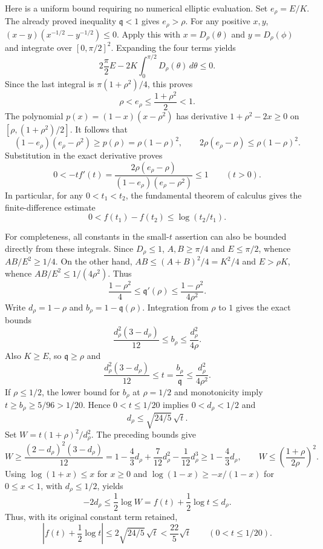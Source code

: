 Here is a uniform bound requiring no numerical elliptic evaluation.
Set $e_\rho=E/K$. The already proved inequality $\mathfrak q<1$ gives $e_\rho>\rho$.
For any positive $x,y$, $(x-y)(x^{-1/2}-y^{-1/2})\le0$.
Apply this with $x=D_\rho(\theta)$ and $y=D_\rho(\phi)$ and
integrate over $[0,\pi/2]^2$. Expanding the four terms yields
\[
 2\frac\pi2 E-2K\int_0^{\pi/2}D_\rho(\theta)\,d\theta\le0.
\]
Since the last integral is $\pi(1+\rho^2)/4$, this proves
\[
 \rho<e_\rho\le\frac{1+\rho^2}{2}<1.
\]
The polynomial $p(x)=(1-x)(x-\rho^2)$ has derivative
$1+\rho^2-2x\ge0$ on $[\rho,(1+\rho^2)/2]$.
It follows that
\[
 (1-e_\rho)(e_\rho-\rho^2)\ge p(\rho)=\rho(1-\rho)^2,
 \qquad 2\rho(e_\rho-\rho)\le\rho(1-\rho)^2.
\]
Substitution in the exact derivative proves
\[
 \boxed{0<-t f'(t)
 =\frac{2\rho(e_\rho-\rho)}{(1-e_\rho)(e_\rho-\rho^2)}\le1\qquad(t>0).}
\]
In particular, for any $0<t_1<t_2$, the fundamental theorem of calculus
gives the finite-difference estimate
\[
 0<f(t_1)-f(t_2)\le\log(t_2/t_1).
\]

For completeness, all constants in the small-$t$ assertion can also
be bounded directly from these integrals. Since $D_\rho\le1$,
$A,B\ge\pi/4$ and $E\le\pi/2$, whence $AB/E^2\ge1/4$.
On the other hand, $AB\le(A+B)^2/4=K^2/4$ and $E>\rho K$,
whence $AB/E^2\le1/(4\rho^2)$. Thus
\[
 \frac{1-\rho^2}{4}\le \mathfrak q'(\rho)
 \le\frac{1-\rho^2}{4\rho^2}.
\]
Write $d_\rho=1-\rho$ and $b_\rho=1-\mathfrak q(\rho)$.
Integration from $\rho$ to $1$ gives the exact bounds
\[
 \frac{d_\rho^2(3-d_\rho)}{12}\le b_\rho
 \le\frac{d_\rho^2}{4\rho}.
\]
Also $K\ge E$, so $\mathfrak q\ge\rho$ and
\[
 \frac{d_\rho^2(3-d_\rho)}{12}\le t=\frac{b_\rho}{\mathfrak q}
 \le\frac{d_\rho^2}{4\rho^2}.
\]
If $\rho\le1/2$, the lower bound for $b_\rho$ at $\rho=1/2$ and
monotonicity imply $t\ge b_\rho\ge5/96>1/20$.
Hence $0<t\le1/20$ implies $0<d_\rho<1/2$ and
\[
 d_\rho\le\sqrt{24/5}\,\sqrt t.
\]
Set $W=t(1+\rho)^2/d_\rho^2$. The preceding bounds give
\[
 W\ge\frac{(2-d_\rho)^2(3-d_\rho)}{12}
 =1-\frac43d_\rho+\frac7{12}d_\rho^2-\frac1{12}d_\rho^3
 \ge1-\frac43d_\rho,
 \qquad
 W\le\left(\frac{1+\rho}{2\rho}\right)^2.
\]
Using $\log(1+x)\le x$ for $x\ge0$ and
$\log(1-x)\ge-x/(1-x)$ for $0\le x<1$, with
$d_\rho\le1/2$, yields
\[
 -2d_\rho\le\frac12\log W
 =f(t)+\frac12\log t\le d_\rho.
\]
Thus, with its original constant term retained,
\[
 \boxed{
 \left|f(t)+\frac12\log t\right|
 \le2\sqrt{24/5}\,\sqrt t<\frac{22}{5}\sqrt t
 \qquad(0<t\le1/20).}
\]

